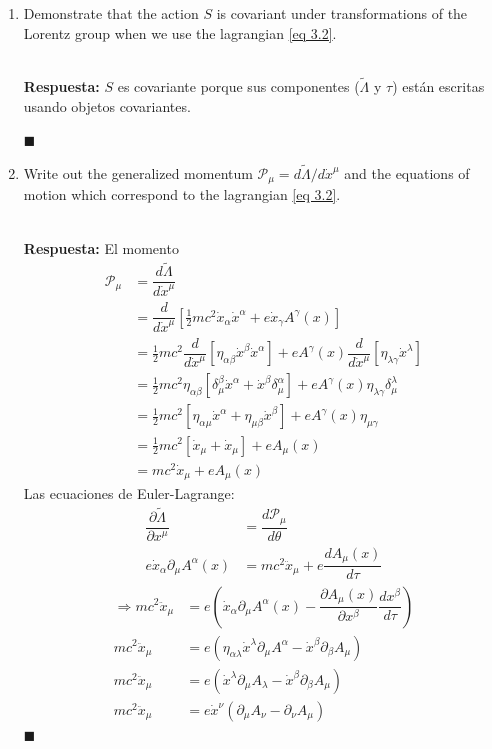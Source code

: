 \documentclass[]{article}
\numberwithin{equation}{section}
\newcommand{\0}{\textcolor{gray}{0}}
\newcommand{\pd}[2]{\dfrac{\partial #1}{\partial #2}}
\newcommand{\td}[2]{\dfrac{d #1}{d #2}}
\newcommand{\ltd}[2]{d #1/d #2}
\newcommand{\qed}{\hfill\(\blacksquare\)}
\newcommand{\resp}{
	\\
	
	\textbf{Respuesta:} }
\begin{document}
\begin{enumerate}	
	\item[(a)] Demonstrate that the action $S$ is covariant under transformations of the Lorentz group when we use the lagrangian \ref{eq 3.2}.
	\resp $S$ es covariante porque sus componentes ($\tilde{\Lambda}$ y $\tau$) están escritas usando objetos covariantes.
	
	\qed
	
	\item[(b)] Write out the generalized momentum $\mathcal{P}_\mu = \ltd{\tilde{\Lambda}}{\dot{x}^\mu}$ and the equations of motion which correspond to the lagrangian \ref{eq 3.2}.
	\resp El momento
	\begin{align*}
		\mathcal{P}_\mu &= \td{\tilde{\Lambda}}{\dot{x}^\mu}\\
		&= \td{}{\dot{x}^\mu} \left[\frac{1}{2} mc^2 \dot{x}_\alpha \dot{x}^\alpha + e\dot{x}_\gamma A^\gamma (x)\right]\\
		&= \frac{1}{2} mc^2 \td{}{\dot{x}^\mu} \left[\eta_{\alpha\beta} \dot{x}^\beta \dot{x}^\alpha \right] + e A^\gamma (x) \td{}{\dot{x}^\mu} \left[\eta_{\lambda\gamma} \dot{x}^\lambda\right]\\
		&= \frac{1}{2} mc^2 \eta_{\alpha\beta} \left[\delta_\mu^\beta \dot{x}^\alpha + \dot{x}^\beta \delta_\mu^\alpha \right] + e A^\gamma (x) \eta_{\lambda\gamma} \delta_\mu^\lambda\\
		&= \frac{1}{2} mc^2 \left[\eta_{\alpha\mu} \dot{x}^\alpha + \eta_{\mu\beta} \dot{x}^\beta \right] + e A^\gamma (x) \eta_{\mu\gamma}\\
		&= \frac{1}{2} mc^2 \left[\dot{x}_\mu + \dot{x}_\mu \right] + e A_\mu (x)\\
		&= mc^2 \dot{x}_\mu + e A_\mu (x)
	\end{align*}
	Las ecuaciones de Euler-Lagrange:
	\begin{align*}
		\pd{\tilde{\Lambda}}{x^\mu} &= \td{\mathcal{P}_\mu}{\theta}\\
		e\dot{x}_\alpha \partial_\mu A^\alpha (x) &= mc^2 \ddot{x}_\mu + e \td{A_\mu (x)}{\tau}
	\end{align*}
	\begin{align*}
		\Rightarrow mc^2 \ddot{x}_\mu &= e \left(\dot{x}_\alpha \partial_\mu A^\alpha (x) - \pd{A_\mu (x)}{x^\beta} \td{x^\beta}{\tau}\right)\\
		mc^2 \ddot{x}_\mu &= e \left(\eta_{\alpha\lambda} \dot{x}^\lambda \partial_\mu A^\alpha - \dot{x}^\beta \partial_\beta A_\mu \right)\\
		mc^2 \ddot{x}_\mu &= e \left(\dot{x}^\lambda \partial_\mu A_\lambda - \dot{x}^\beta \partial_\beta A_\mu \right)\\
		mc^2 \ddot{x}_\mu &= e \dot{x}^\nu \left(\partial_\mu A_\nu - \partial_\nu A_\mu \right)
	\end{align*}
	\qed
	

\end{enumerate}
\end{document}
